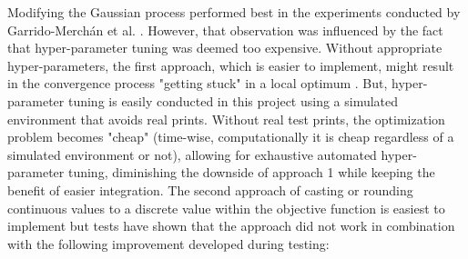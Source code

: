 Modifying the Gaussian process performed best in the experiments conducted by Garrido-Merchán et al. \cite{garrido2020dealing}. However, that observation was influenced by the fact that hyper-parameter tuning was deemed too expensive. Without appropriate hyper-parameters, the first approach, which is easier to implement, might result in the convergence process "getting stuck" in a local optimum \cite{garrido2020dealing}. But, hyper-parameter tuning is easily conducted in this project using a simulated environment that avoids real prints. Without real test prints, the optimization problem becomes "cheap" (time-wise, computationally it is cheap regardless of a simulated environment or not), allowing for exhaustive automated hyper-parameter tuning, diminishing the downside of approach 1 while keeping the benefit of easier integration. The second approach of casting or rounding continuous values to a discrete value within the objective function is easiest to implement but tests have shown that the approach did not work in combination with the following improvement developed during testing: 

